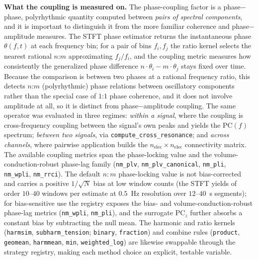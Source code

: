 \documentclass[11pt]{article}
\begin{document}
\textbf{What the coupling is measured on.} The phase-coupling factor is a phase$-$phase, polyrhythmic quantity computed between \emph{pairs of spectral components}, and it is important to distinguish it from the more familiar coherence and phase$-$amplitude measures. The STFT phase estimator returns the instantaneous phase $\theta(f,t)$ at each frequency bin; for a pair of bins $f_i,f_j$ the ratio kernel selects the nearest rational $n$:$m$ approximating $f_j/f_i$, and the coupling metric measures how consistently the generalized phase difference $n\cdot\theta_i - m\cdot\theta_j$ stays fixed over time. Because the comparison is between two phases at a rational frequency ratio, this detects $n$:$m$ (polyrhythmic) phase relations between oscillatory components rather than the special case of $1$:$1$ phase coherence, and it does not involve amplitude at all, so it is distinct from phase$-$amplitude coupling. The same operator was evaluated in three regimes: \emph{within a signal}, where the coupling is cross-frequency coupling between the signal's own peaks and yields the $\mathrm{PC}(f)$ spectrum; \emph{between two signals}, via \texttt{compute\_cross\_resonance}; and \emph{across channels}, where pairwise application builds the $n_{\mathrm{elec}}\times n_{\mathrm{elec}}$ connectivity matrix. The available coupling metrics span the phase-locking value and the volume-conduction-robust phase-lag family (\texttt{nm\_plv}, \texttt{nm\_plv\_canonical}, \texttt{nm\_pli}, \texttt{nm\_wpli}, \texttt{nm\_rrci}). The default $n{:}m$ phase-locking value is not bias-corrected and carries a positive $1/\sqrt{N}$ bias at low window counts (the STFT yields of order $10$--$40$ windows per estimate at $0.5$~Hz resolution over $12$--$40$~s segments); for bias-sensitive use the registry exposes the bias- and volume-conduction-robust phase-lag metrics (\texttt{nm\_wpli}, \texttt{nm\_pli}), and the surrogate $\mathrm{PC}_z$ further absorbs a constant bias by subtracting the null mean. The harmonic and ratio kernels (\texttt{harmsim}, \texttt{subharm\_tension}; \texttt{binary}, \texttt{fraction}) and combine rules (\texttt{product}, \texttt{geomean}, \texttt{harmmean}, \texttt{min}, \texttt{weighted\_log}) are likewise swappable through the strategy registry, making each method choice an explicit, testable variable.
\end{document}
